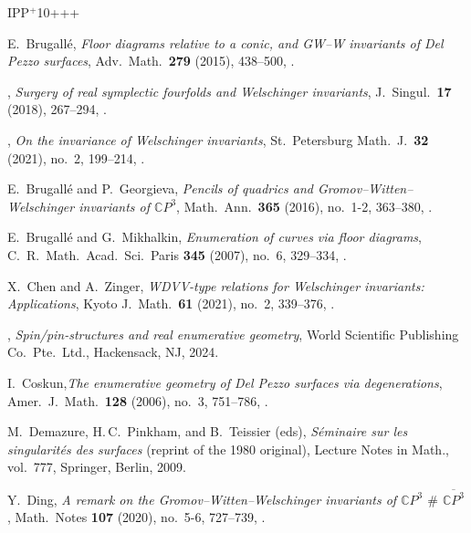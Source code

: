 \newcommand{\etalchar}[1]{$^{#1}$}

\begin{thebibliography}{IPP{\etalchar{+}}10+++}

E.~Brugall{\'e}, \emph{Floor diagrams relative to a conic, and {GW}--{W}
  invariants of {D}el {P}ezzo surfaces}, Adv.\ Math.\ \textbf{279}
  (2015), 438--500, .

\bysame, \emph{Surgery of real symplectic fourfolds and {W}elschinger
  invariants}, J.~Singul.\ \textbf{17} (2018), 267--294,
.

  \bysame, \emph{On the invariance of {W}elschinger invariants},
  St.\ Petersburg Math.~J.\ \textbf{32} (2021), no.~2, 199--214,
.

E.~Brugall{\'e} and P.~Georgieva, \emph{Pencils of quadrics and
  {G}romov--{W}itten--{W}elschinger invariants of $\mathbb{C} {P}^3$},
  Math.\ Ann.\ \textbf{365} (2016), no.~1-2, 363--380,
.

E.~Brugall{\'e} and G.~Mikhalkin, \emph{Enumeration of curves via floor
  diagrams}, C.~R.~Math.\ Acad.\ Sci.\ Paris \textbf{345} (2007), no.~6, 329--334,
.

X.~Chen and A.~Zinger, \emph{WDVV-type relations for {W}elschinger
  invariants: {A}pplications}, Kyoto J.~Math.\ \textbf{61} (2021),
  no.~2, 339--376, .

\bysame, \emph{Spin/pin-structures and real enumerative geometry}, World
  Scientific Publishing Co.\ Pte.\ Ltd., Hackensack, NJ, 2024.

  I.~Coskun,\emph{The enumerative geometry of Del Pezzo surfaces via degenerations}, Amer.~J.\ Math.\ \textbf{128} (2006), no.~3, 751--786, .

M.~Demazure, H.\,C.~Pinkham, and B.~Teissier (eds), \emph{S{\'e}minaire sur les
singularit{\'e}s des surfaces} (reprint of the 1980 original), Lecture Notes in Math., vol.~777, Springer, Berlin, 2009.

Y.~Ding, \emph{A remark on the {G}romov--{W}itten--{W}elschinger invariants of
  $\mathbb{C}{P}^3$ $\#$ $\overline{{\mathbb{C}P}^3}$}, Math.\ Notes
  \textbf{107} (2020), no.~5-6, 727--739,
.


\end{thebibliography}
